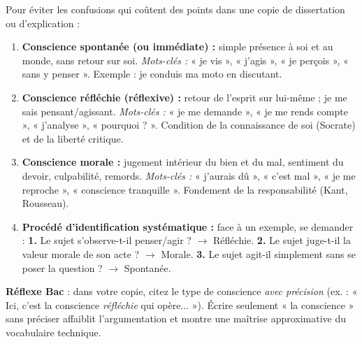 \documentclass[11pt]{article}
\newcommand{\cle}[1]{{\popxbold\color{popdark}#1}}
\begin{document}
\begin{methode}
Pour éviter les confusions qui coûtent des points dans une copie de dissertation ou d'explication :
\begin{enumerate}
\item \textbf{Conscience spontanée (ou immédiate) :} simple présence à soi et au monde, sans retour sur soi. \textit{Mots-clés :} « je vis », « j'agis », « je perçois », « sans y penser ». Exemple : je conduis ma moto en discutant.
\item \textbf{Conscience réfléchie (réflexive) :} retour de l'esprit sur lui-même ; je me sais pensant/agissant. \textit{Mots-clés :} « je me demande », « je me rends compte », « j'analyse », « pourquoi ? ». Condition de la \cle{connaissance de soi} (Socrate) et de la \cle{liberté critique}.
\item \textbf{Conscience morale :} jugement intérieur du bien et du mal, sentiment du devoir, culpabilité, remords. \textit{Mots-clés :} « j'aurais dû », « c'est mal », « je me reproche », « conscience tranquille ». Fondement de la \cle{responsabilité} (Kant, Rousseau).
\item \textbf{Procédé d'identification systématique :} face à un exemple, se demander : \textbf{1.} Le sujet s'observe-t-il penser/agir ? $\rightarrow$ Réfléchie. \textbf{2.} Le sujet juge-t-il la valeur morale de son acte ? $\rightarrow$ Morale. \textbf{3.} Le sujet agit-il simplement sans se poser la question ? $\rightarrow$ Spontanée.
\end{enumerate}
\textbf{Réflexe Bac} : dans votre copie, citez le type de conscience \emph{avec précision} (ex. : « Ici, c'est la conscience \emph{réfléchie} qui opère... »). Écrire seulement « la conscience » sans préciser affaiblit l'argumentation et montre une maîtrise approximative du vocabulaire technique.
\end{methode}
\end{document}
